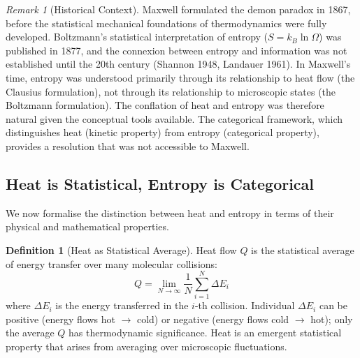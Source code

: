 \documentclass[12pt,a4paper]{article}
\theoremstyle{definition}
\newtheorem{definition}[theorem]{Definition}
\theoremstyle{remark}
\newtheorem{remark}[theorem]{Remark}
\begin{document}
\begin{remark}[Historical Context]
\label{rem:historical_context}
Maxwell formulated the demon paradox in 1867, before the statistical mechanical foundations of thermodynamics were fully developed. Boltzmann's statistical interpretation of entropy ($S = k_B \ln \Omega$) was published in 1877, and the connexion between entropy and information was not established until the 20th century (Shannon 1948, Landauer 1961). In Maxwell's time, entropy was understood primarily through its relationship to heat flow (the Clausius formulation), not through its relationship to microscopic states (the Boltzmann formulation). The conflation of heat and entropy was therefore natural given the conceptual tools available. The categorical framework, which distinguishes heat (kinetic property) from entropy (categorical property), provides a resolution that was not accessible to Maxwell.
\end{remark}

\subsection{Heat is Statistical, Entropy is Categorical}

We now formalise the distinction between heat and entropy in terms of their physical and mathematical properties.

\begin{definition}[Heat as Statistical Average]
\label{def:heat_statistical}
Heat flow $Q$ is the statistical average of energy transfer over many molecular collisions:
\begin{equation}
Q = \lim_{N \to \infty} \frac{1}{N} \sum_{i=1}^{N} \Delta E_i
\label{eq:heat_average}
\end{equation}
where $\Delta E_i$ is the energy transferred in the $i$-th collision. Individual $\Delta E_i$ can be positive (energy flows hot $\to$ cold) or negative (energy flows cold $\to$ hot); only the average $Q$ has thermodynamic significance. Heat is an emergent statistical property that arises from averaging over microscopic fluctuations.
\end{definition}
\end{document}

